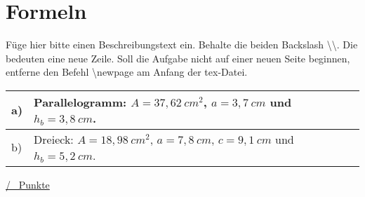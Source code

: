 \newpage
\section{Formeln}
Füge hier bitte einen Beschreibungstext ein. Behalte die beiden Backslash \textbackslash\textbackslash. Die bedeuten eine neue Zeile. Soll die Aufgabe nicht auf einer neuen Seite beginnen, entferne den Befehl \textbackslash newpage am Anfang der tex-Datei.\\
\begin{xltabular}{\textwidth}{|C{0.75cm}|X|}
\hline
a)&Parallelogramm:  $A=37,62~cm^2$, $a=3,7~cm$ und $h_b=3,8~cm$.
\\\hline
b)&Dreieck:  $A=18,98~cm^2$, $a=7,8~cm$, $c=9,1~cm$  und $h_b=5,2~cm$.
\\\hline
\end{xltabular}
\vspace{0.5cm}
\begin{flushright}
\underline{\hspace{2cm}/ \punkte~Punkte}
\end{flushright}